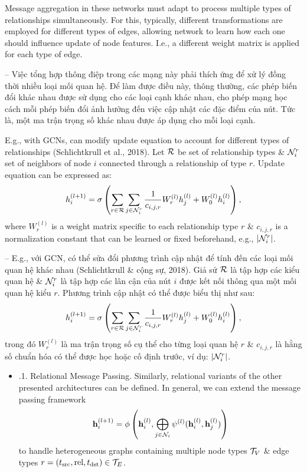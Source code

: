 \documentclass{article}
\begin{document}
\begin{itemize}
\begin{itemize}
        Message aggregation in these networks must adapt to process multiple types of relationships simultaneously. For this, typically, different transformations are employed for different types of edges, allowing network to learn how each one should influence update of node features. I.e., a different weight matrix is applied for each type of edge.

        -- Việc tổng hợp thông điệp trong các mạng này phải thích ứng để xử lý đồng thời nhiều loại mối quan hệ. Để làm được điều này, thông thường, các phép biến đổi khác nhau được sử dụng cho các loại cạnh khác nhau, cho phép mạng học cách mỗi phép biến đổi ảnh hưởng đến việc cập nhật các đặc điểm của nút. Tức là, một ma trận trọng số khác nhau được áp dụng cho mỗi loại cạnh.

        E.g., with GCNs, can modify update equation to account for different types of relationships (Schlichtkrull et al., 2018). Let ${\cal R}$ be set of relationship types \& ${\cal N}_i^r$ set of neighbors of node $i$ connected through a relationship of type $r$. Update equation can be expressed as:
        \begin{equation*}
            h_i^{(l + 1)} = \sigma\left(\sum_{r\in{\cal R}}\sum_{j\in{\cal N}_i^r} \frac{1}{c_{i,j,r}}W_r^{(l)}h_j^{(l)} + W_0^{(l)}h_i^{(l)}\right),
        \end{equation*}
        where $W_r^{(l)}$ is a weight matrix specific to each relationship type $r$ \& $c_{i,j,r}$ is a normalization constant that can be learned or fixed beforehand, e.g., $|{\cal N}_i^r|$.

        -- E.g., với GCN, có thể sửa đổi phương trình cập nhật để tính đến các loại mối quan hệ khác nhau (Schlichtkrull \& cộng sự, 2018). Giả sử ${\cal R}$ là tập hợp các kiểu quan hệ \& ${\cal N}_i^r$ là tập hợp các lân cận của nút $i$ được kết nối thông qua một mối quan hệ kiểu $r$. Phương trình cập nhật có thể được biểu thị như sau:
        \begin{equation*}
            h_i^{(l + 1)} = \sigma\left(\sum_{r\in{\cal R}}\sum_{j\in{\cal N}_i^r} \frac{1}{c_{i,j,r}}W_r^{(l)}h_j^{(l)} + W_0^{(l)}h_i^{(l)}\right),
        \end{equation*}
        trong đó $W_r^{(l)}$ là ma trận trọng số cụ thể cho từng loại quan hệ $r$ \& $c_{i,j,r}$ là hằng số chuẩn hóa có thể được học hoặc cố định trước, ví dụ: $|{\cal N}_i^r|$.
        \begin{itemize}
            \item {.1. Relational Message Passing.} Similarly, relational variants of the other presented architectures can be defined. In general, we can extend the message passing framework
            \begin{equation*}
                {\bf h}_i^{(l + 1)} = \phi\left({\bf h}_i^{(l)},\bigoplus_{j\in{\cal N}_i} \psi^{(l)}({\bf h}_i^{(l)},{\bf h}_j^{(l)})\right)
            \end{equation*}
            to handle heterogeneous graphs containing multiple node types ${\cal T}_V$ \& edge types $r = (t_{\rm src},{\rm rel},t_{\rm dst})\in{\cal T}_E$.


\end{itemize}
\end{itemize}
\end{itemize}
\end{document}
